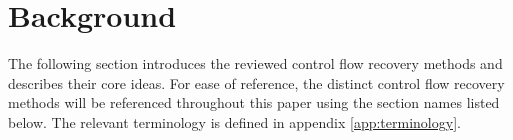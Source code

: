 
\section{Background}

The following section introduces the reviewed control flow recovery methods and describes their core ideas. For ease of reference, the distinct control flow recovery methods will be referenced throughout this paper using the section names listed below. The relevant terminology is defined in appendix \ref{app:terminology}.






